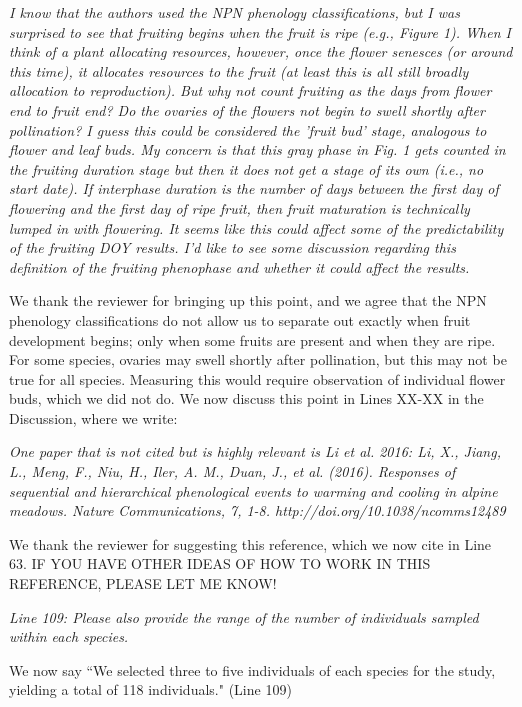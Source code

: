 \documentclass[10.95pt,a4paper]{letter}
\begin{document}
\par \emph{I know that the authors used the NPN phenology classifications, but I was surprised to see that fruiting begins when the fruit is ripe (e.g., Figure 1). When I think of a plant allocating resources, however, once the flower senesces (or around this time), it allocates resources to the fruit (at least this is all still broadly allocation to reproduction).  But why not count fruiting as the days from flower end to fruit end? Do the ovaries of the flowers not begin to swell shortly after pollination? I guess this could be considered the 'fruit bud' stage, analogous to flower and leaf buds.  My concern is that this gray phase in Fig. 1 gets counted in the fruiting duration stage but then it does not get a stage of its own (i.e., no start date). If interphase duration is the number of days between the first day of flowering and the first day of ripe fruit, then fruit maturation is technically lumped in with flowering. It seems like this could affect some of the predictability of the fruiting DOY results. I'd like to see some discussion regarding this definition of the fruiting phenophase and whether it could affect the results.}  
\par We thank the reviewer for bringing up this point, and we agree that the NPN phenology classifications do not allow us to separate out exactly when fruit development begins; only when some fruits are present and when they are ripe. For some species, ovaries may swell shortly after pollination, but this may not be true for all species. Measuring this would require observation of individual flower buds, which we did not do. We now discuss this point in Lines XX-XX in the Discussion, where we write:


\par \emph{One paper that is not cited but is highly relevant is Li et al. 2016: Li, X., Jiang, L., Meng, F., Niu, H., Iler, A. M., Duan, J., et al. (2016). Responses of sequential and hierarchical phenological events to warming and cooling in alpine meadows. Nature Communications, 7, 1-8. http://doi.org/10.1038/ncomms12489}

\par We thank the reviewer for suggesting this reference, which we now cite in Line 63. IF YOU HAVE OTHER IDEAS OF HOW TO WORK IN THIS REFERENCE, PLEASE LET ME KNOW!

\par \emph{Line 109: Please also provide the range of the number of individuals sampled within each species. } 
\par We now say ``We selected three to five individuals of each species for the study, yielding a total of 118 individuals." (Line 109)
\end{document}
